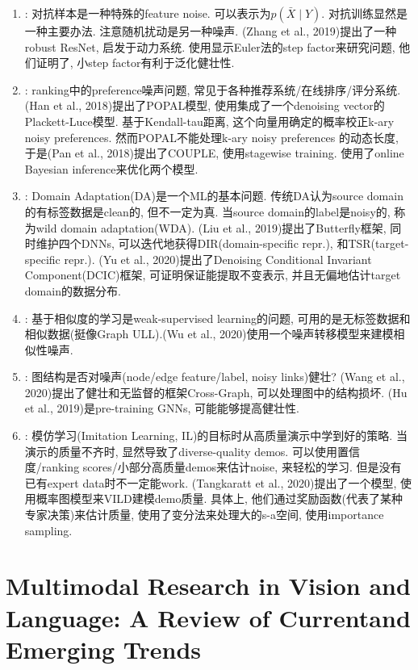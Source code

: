 \documentclass{article}
\begin{document}
\begin{enumerate}
    \item {}: 对抗样本是一种特殊的feature noise. 可以表示为$p(\bar{X} \mid Y)$. 对抗训练显然是一种主要办法. 注意随机扰动是另一种噪声. (Zhang et al., 2019)提出了一种robust ResNet, 启发于动力系统. 使用显示Euler法的step factor来研究问题, 他们证明了, 小step factor有利于泛化健壮性.
    \item {}: ranking中的preference噪声问题, 常见于各种推荐系统/在线排序/评分系统. (Han et al., 2018)提出了POPAL模型, 使用集成了一个denoising vector的Plackett-Luce模型. 基于Kendall-tau距离, 这个向量用确定的概率校正k-ary noisy preferences. 然而POPAL不能处理k-ary noisy preferences 的动态长度, 于是(Pan et al., 2018)提出了COUPLE, 使用stagewise training. 使用了online Bayesian inference来优化两个模型.
    \item {}: Domain Adaptation(DA)是一个ML的基本问题. 传统DA认为source domain的有标签数据是clean的, 但不一定为真. 当source domain的label是noisy的, 称为wild domain adaptation(WDA). (Liu et al., 2019)提出了Butterfly框架, 同时维护四个DNNs, 可以迭代地获得DIR(domain-specific repr.), 和TSR(target-specific repr.). (Yu et al.,  2020)提出了Denoising Conditional Invariant Component(DCIC)框架, 可证明保证能提取不变表示, 并且无偏地估计target domain的数据分布.
    \item {}: 基于相似度的学习是weak-supervised learning的问题, 可用的是无标签数据和相似数据(挺像Graph ULL).(Wu et al., 2020)使用一个噪声转移模型来建模相似性噪声.
    \item {}: 图结构是否对噪声(node/edge feature/label, noisy links)健壮? (Wang  et  al., 2020)提出了健壮和无监督的框架Cross-Graph, 可以处理图中的结构损坏. (Hu et al., 2019)是pre-training GNNs, 可能能够提高健壮性.
    \item {}: 模仿学习(Imitation Learning, IL)的目标时从高质量演示中学到好的策略. 当演示的质量不齐时, 显然导致了diverse-quality demos. 可以使用置信度/ranking scores/小部分高质量demos来估计noise, 来轻松的学习. 但是没有已有expert data时不一定能work. (Tangkaratt et al., 2020)提出了一个模型, 使用概率图模型来VILD建模demo质量. 具体上, 他们通过奖励函数(代表了某种专家决策)来估计质量, 使用了变分法来处理大的s-a空间, 使用importance sampling.
\end{enumerate}

\section{Multimodal Research in Vision and Language: A Review of Currentand Emerging Trends}
\end{document}
